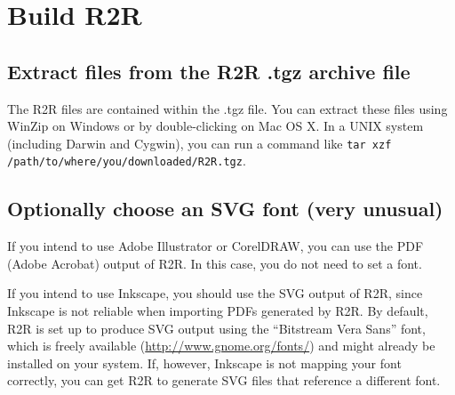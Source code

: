 \documentclass[letterpaper,12pt]{report}
\newcommand{\comment}[1]{}
\begin{document}
\comment{
\section{Install the DejaVu font}

R2R will generate PDF files with the DejaVu Sans Condensed font.
You should ensure that this font is installed, and available to your
drawing program (Adobe Illustrator, Inkscape or Corel Draw).
Otherwise, your drawing program might map the font to a different one, which could
change the layout.

{\bf Note}: if you want to get started quickly, you can skip this step for now.
The PDF files generated by R2R can be viewed in Adobe Reader regardless of whether
the font is installed.

The font and installation instructions are available in the {\tt dejavu} subdirectory of the R2R distribution.  Only the DejaVu Sans Condensed font is actually used by R2R-generated PDF files.  However, you might also want to install the bold and oblique versions of this font, for use in your drawing program.
The source of the font files are \url{http://dejavu.sourceforge.net}
}

\section{Build R2R}

\subsection{Extract files from the R2R .tgz archive file}

The R2R files are contained within the .tgz file.  You can extract these files
using WinZip on Windows or by double-clicking on Mac OS X.
In a UNIX system (including Darwin and Cygwin), you can run a command like
{\tt tar xzf /path/to/where/you/downloaded/R2R.tgz}.

\subsection{Optionally choose an SVG font (very unusual)}

If you intend to use Adobe Illustrator or CorelDRAW, you can use the PDF (Adobe Acrobat) output of R2R.
In this case, you do not need to set a font.

If you intend to use Inkscape, you should use the SVG output of R2R, since Inkscape is not reliable when importing
PDFs generated by R2R.
By default, R2R is set up to produce SVG output using the ``Bitstream Vera Sans'' font, which is freely available
(\url{http://www.gnome.org/fonts/}) and might already be installed on your system.
If, however, Inkscape is not mapping your font correctly, you can get R2R to generate SVG files that reference a different font.
\end{document}
